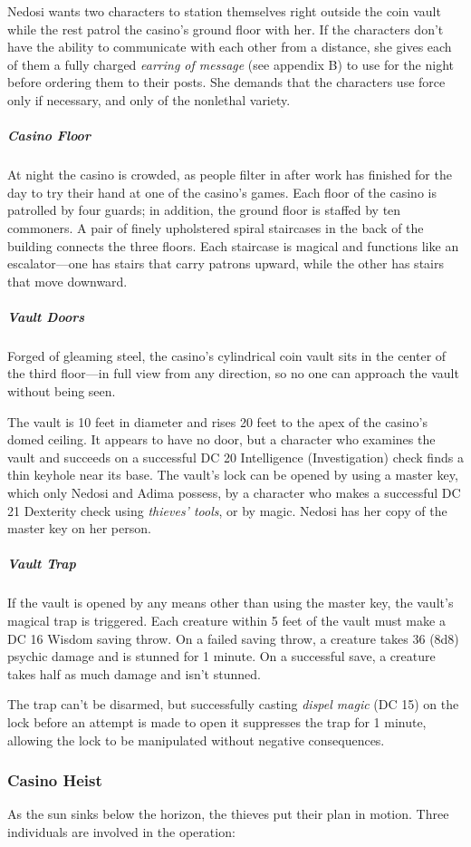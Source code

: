 \documentclass[10pt,a4paper,twoside,fancy,bg=print,twocolumn,openany,nodeprecatedcode]{dndbook}
\begin{document}
Nedosi wants two characters to station themselves right outside the coin vault while the rest patrol the casino's ground floor with her. If the characters don't have the ability to communicate with each other from a distance, she gives each of them a fully charged \textit{earring of message} (see appendix B) to use for the night before ordering them to their posts. She demands that the characters use force only if necessary, and only of the nonlethal variety.

\subparagraph{Casino Floor}
At night the casino is crowded, as people filter in after work has finished for the day to try their hand at one of the casino's games. Each floor of the casino is patrolled by four guards; in addition, the ground floor is staffed by ten commoners. A pair of finely upholstered spiral staircases in the back of the building connects the three floors. Each staircase is magical and functions like an escalator—one has stairs that carry patrons upward, while the other has stairs that move downward.

\subparagraph{Vault Doors}
Forged of gleaming steel, the casino's cylindrical coin vault sits in the center of the third floor—in full view from any direction, so no one can approach the vault without being seen.

The vault is 10 feet in diameter and rises 20 feet to the apex of the casino's domed ceiling. It appears to have no door, but a character who examines the vault and succeeds on a successful DC 20 Intelligence (Investigation) check finds a thin keyhole near its base. The vault's lock can be opened by using a master key, which only Nedosi and Adima possess, by a character who makes a successful DC 21 Dexterity check using \textit{thieves' tools}, or by magic. Nedosi has her copy of the master key on her person.

\subparagraph{Vault Trap}
If the vault is opened by any means other than using the master key, the vault's magical trap is triggered. Each creature within 5 feet of the vault must make a DC 16 Wisdom saving throw. On a failed saving throw, a creature takes 36 (8d8) psychic damage and is stunned for 1 minute. On a successful save, a creature takes half as much damage and isn't stunned.

The trap can't be disarmed, but successfully casting \textit{dispel magic} (DC 15) on the lock before an attempt is made to open it suppresses the trap for 1 minute, allowing the lock to be manipulated without negative consequences.

\subsubsection{Casino Heist}
As the sun sinks below the horizon, the thieves put their plan in motion. Three individuals are involved in the operation:
\end{document}
